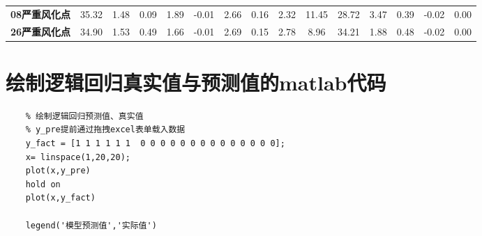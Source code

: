 \documentclass[withoutpreface,bwprint]{cumcmthesis} %
\begin{document}
\begin{appendices}
\begin{table}[!h]
\begin{tabular}{@{}ccccccccccccccc@{}}
			\textbf{08严重风化点} & 35.32                                                          & 1.48                                                          & 0.09                                                         & 1.89                                                         & -0.01                                                        & 2.66                                                           & 0.16                                                           & 2.32                                                         & 11.45                                                        & 28.72                                                        & 3.47                                                            & 0.39                                                         & -0.02                                                         & 0.00                                                          \\
			\textbf{26严重风化点} & 34.90                                                          & 1.53                                                          & 0.49                                                         & 1.66                                                         & -0.01                                                        & 2.69                                                           & 0.15                                                           & 2.78                                                         & 8.96                                                         & 34.21                                                        & 1.88                                                            & 0.48                                                         & -0.02                                                         & 0.00                                                          \\ \bottomrule
		\end{tabular}
	\end{table}

\section{绘制逻辑回归真实值与预测值的matlab代码}
\begin{lstlisting}
	% 绘制逻辑回归预测值、真实值
	% y_pre提前通过拖拽excel表单载入数据
	y_fact = [1 1 1 1 1 1  0 0 0 0 0 0 0 0 0 0 0 0 0 0];
	x= linspace(1,20,20);
	plot(x,y_pre)
	hold on 
	plot(x,y_fact)
	
	legend('模型预测值','实际值')
\end{lstlisting}



\end{appendices}
\end{document}
